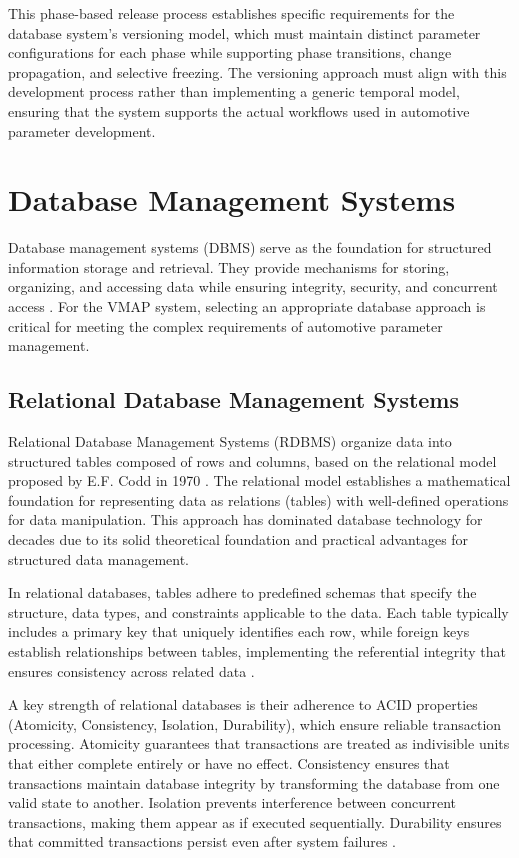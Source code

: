 This phase-based release process establishes specific requirements for the database system's versioning model, which must maintain distinct parameter configurations for each phase while supporting phase transitions, change propagation, and selective freezing. The versioning approach must align with this development process rather than implementing a generic temporal model, ensuring that the system supports the actual workflows used in automotive parameter development.


\section{Database Management Systems}
\label{sec:database-management-systems}

Database management systems (DBMS) serve as the foundation for structured information storage and retrieval. They provide mechanisms for storing, organizing, and accessing data while ensuring integrity, security, and concurrent access \cite{elmasri2015fundamentals}. For the VMAP system, selecting an appropriate database approach is critical for meeting the complex requirements of automotive parameter management.

\subsection{Relational Database Management Systems}
\label{subsec:relational-database-management-systems}

Relational Database Management Systems (RDBMS) organize data into structured tables composed of rows and columns, based on the relational model proposed by E.F. Codd in 1970 \cite{codd1970relational}. The relational model establishes a mathematical foundation for representing data as relations (tables) with well-defined operations for data manipulation. This approach has dominated database technology for decades due to its solid theoretical foundation and practical advantages for structured data management.

In relational databases, tables adhere to predefined schemas that specify the structure, data types, and constraints applicable to the data. Each table typically includes a primary key that uniquely identifies each row, while foreign keys establish relationships between tables, implementing the referential integrity that ensures consistency across related data \cite{elmasri2015fundamentals}.

A key strength of relational databases is their adherence to ACID properties (Atomicity, Consistency, Isolation, Durability), which ensure reliable transaction processing. Atomicity guarantees that transactions are treated as indivisible units that either complete entirely or have no effect. Consistency ensures that transactions maintain database integrity by transforming the database from one valid state to another. Isolation prevents interference between concurrent transactions, making them appear as if executed sequentially. Durability ensures that committed transactions persist even after system failures \cite{elmasri2015fundamentals}.

